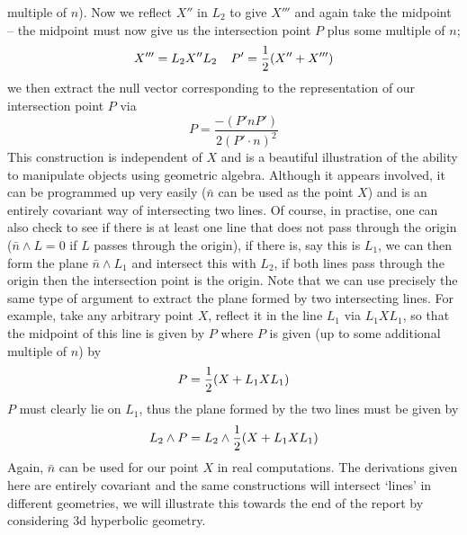 multiple of $n$). Now we reflect $X''$ in $L_2$ to give $X'''$ and again
take the midpoint -- the midpoint must now give us the
intersection point $P$ plus some multiple of $n$;
%
\[ X''' = L_2X''L_2 \;\;\;\;  P' = \frac{1}{2} (X''+X''')   \]
%
we then extract the null vector corresponding to the representation of our
intersection point $P$ via
%
\[ P = \frac{-(P'nP')}{2(P'\cdot n)^2}   \]
%
This construction is independent of $X$ and is a
beautiful illustration of the ability to manipulate
objects using geometric algebra. Although it appears
involved, it can be programmed up very easily ($\bar{n}$
can be used as the point $X$) and is an entirely
covariant way of intersecting two lines. Of course, in
practise, one can also check to see if there is at least
one line that does not pass through the origin
($\bar{n}\wedge L=0$ if $L$ passes through the origin), if
there is, say this is $L_1$, we can then form the plane
$\bar{n}\wedge L_1$ and intersect this with $L_2$, if both
lines pass through the origin then the intersection point
is the origin. Note that we can use precisely the same
type of argument to extract the plane formed by two
intersecting lines. For example, take any arbitrary point
$X$, reflect it in the line $L_1$ via $L_1 X L_1$, so
that the midpoint of this line is given by $P$ where $P$
is given (up to some additional multiple of $n$) by
%
\[  P = \frac{1}{2} (X + L_1 X L_1)   \]
%
$P$ must clearly lie on $L_1$, thus the plane formed by
the two lines must be given by
%
\begin{equation}
 L_2\wedge P = L_2 \wedge \frac{1}{2}(X + L_1X L_1)
\end{equation}
%
Again, $\bar{n}$ can be used for our point $X$ in real
computations. The derivations given here are entirely
covariant and the same constructions will intersect
`lines' in different geometries, we will illustrate this
towards the end of the report by considering 3d hyperbolic
geometry.

